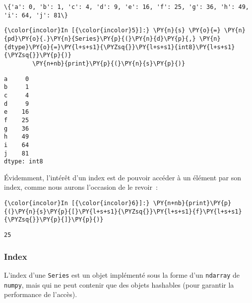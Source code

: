     \begin{Verbatim}[commandchars=\\\{\},frame=single,framerule=0.3mm,rulecolor=\color{cellframecolor}]
\{'a': 0, 'b': 1, 'c': 4, 'd': 9, 'e': 16, 'f': 25, 'g': 36, 'h': 49, 'i': 64, 'j': 81\}
\end{Verbatim}

    \begin{Verbatim}[commandchars=\\\{\},frame=single,framerule=0.3mm,rulecolor=\color{cellframecolor}]
{\color{incolor}In [{\color{incolor}5}]:} \PY{n}{s} \PY{o}{=} \PY{n}{pd}\PY{o}{.}\PY{n}{Series}\PY{p}{(}\PY{n}{d}\PY{p}{,} \PY{n}{dtype}\PY{o}{=}\PY{l+s+s1}{\PYZsq{}}\PY{l+s+s1}{int8}\PY{l+s+s1}{\PYZsq{}}\PY{p}{)}
        \PY{n+nb}{print}\PY{p}{(}\PY{n}{s}\PY{p}{)}
\end{Verbatim}


    \begin{Verbatim}[commandchars=\\\{\},frame=single,framerule=0.3mm,rulecolor=\color{cellframecolor}]
a     0
b     1
c     4
d     9
e    16
f    25
g    36
h    49
i    64
j    81
dtype: int8
\end{Verbatim}

    Évidemment, l'intérêt d'un index est de pouvoir accéder à un élément par
son index, comme nous aurons l'occasion de le revoir~:

    \begin{Verbatim}[commandchars=\\\{\},frame=single,framerule=0.3mm,rulecolor=\color{cellframecolor}]
{\color{incolor}In [{\color{incolor}6}]:} \PY{n+nb}{print}\PY{p}{(}\PY{n}{s}\PY{p}{[}\PY{l+s+s1}{\PYZsq{}}\PY{l+s+s1}{f}\PY{l+s+s1}{\PYZsq{}}\PY{p}{]}\PY{p}{)}
\end{Verbatim}


    \begin{Verbatim}[commandchars=\\\{\},frame=single,framerule=0.3mm,rulecolor=\color{cellframecolor}]
25
\end{Verbatim}

    \hypertarget{index}{%
\subsubsection{Index}\label{index}}

    L'index d'une \texttt{Series} est un objet implémenté sous la forme d'un
\texttt{ndarray} de \texttt{numpy}, mais qui ne peut contenir que des
objets hashables (pour garantir la performance de l'accès).

